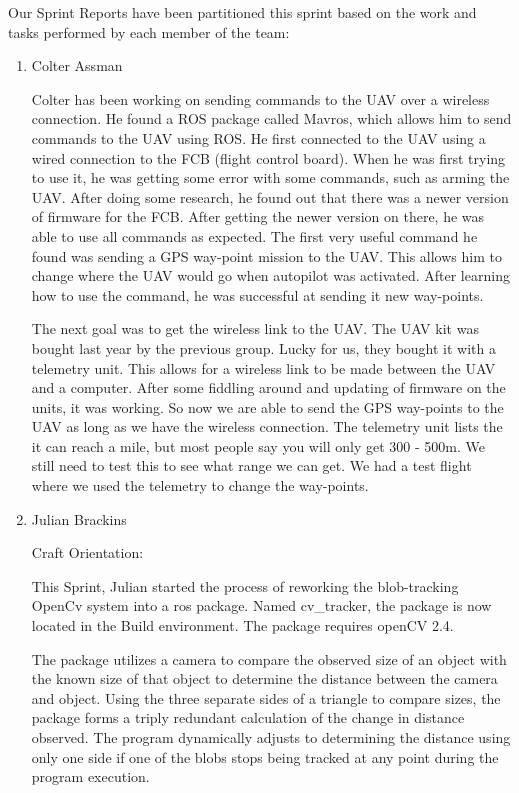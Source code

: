 Our Sprint Reports have been partitioned this sprint based on the work and tasks performed by each member of the team:
\begin{enumerate}

\item Colter Assman

Colter has been working on sending commands to the UAV over a wireless connection. He found a ROS package called Mavros, which allows him to send commands to the UAV using ROS. He first connected to the UAV using a wired connection to the FCB (flight control board). When he was first trying to use it, he was getting some error with some commands, such as arming the UAV. After doing some research, he found out that there was a newer version of firmware for the FCB. After getting the newer version on there, he was able to use all commands as expected. The first very useful command he found was sending a GPS way-point mission to the UAV. This allows him to change where the UAV would go when autopilot was activated. After learning how to use the command, he was successful at sending it new way-points.

The next goal was to get the wireless link to the UAV. The UAV kit was bought last year by the previous group. Lucky for us, they bought it with a telemetry unit. This allows for a wireless link to be made between the UAV and a computer. After some fiddling around and updating of firmware on the units, it was working. So now we are able to send the GPS way-points to the UAV as long as we have the wireless connection. The telemetry unit lists the it can reach a mile, but most people say you will only get 300 - 500m. We still need to test this to see what range we can get. We had a test flight where we used the telemetry to change the way-points. 

\item Julian Brackins

Craft Orientation:

This Sprint, Julian started the process of reworking the blob-tracking OpenCv system into a ros package. Named cv\_tracker, the package is now located in the Build environment. The package requires openCV 2.4.

The package utilizes a camera to compare the observed size of an object with the known size of that object to determine the distance between the camera and object. Using the three separate sides of a triangle to compare sizes, the package forms a triply redundant calculation of the change in distance observed. The program dynamically adjusts to determining the distance using only one side if one of the blobs stops being tracked at any point during the program execution.


\end{enumerate}
